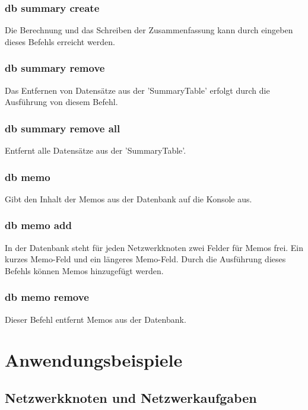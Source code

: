 \documentclass[11pt,a4paper]{report}
\begin{document}
\subsubsection{db summary create}

Die Berechnung und das Schreiben der Zusammenfassung kann durch eingeben dieses Befehls erreicht werden.

\subsubsection{db summary remove}

Das Entfernen von Datensätze aus der 'SummaryTable' erfolgt durch die Ausführung von diesem Befehl.

\subsubsection{db summary remove all}

Entfernt alle Datensätze aus der 'SummaryTable'.

\subsubsection{db memo}

Gibt den Inhalt der Memos aus der Datenbank auf die Konsole aus.

\subsubsection{db memo add}

In der Datenbank steht für jeden Netzwerkknoten zwei Felder für Memos frei. Ein kurzes Memo-Feld und ein längeres Memo-Feld. Durch die Ausführung dieses Befehls können Memos hinzugefügt werden.

\subsubsection{db memo remove}

Dieser Befehl entfernt Memos aus der Datenbank.

\section{Anwendungsbeispiele}

\subsection{Netzwerkknoten und Netzwerkaufgaben}
\end{document}
